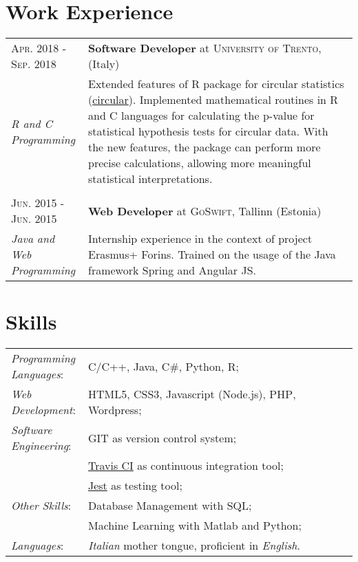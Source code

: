 \documentclass[a4paper,11pt]{article}
\begin{document}
\section{Work Experience}
\begin{tabular}{m{0.225\linewidth}|p{0.775\linewidth}}
  \textsc{Apr. 2018 - Sep. 2018} &
    \textbf{Software Developer} at \textsc{University of Trento}, (Italy) \\
    \emph{R and C Programming} &
    Extended features of R package for circular statistics (\href{https://r-forge.r-project.org/projects/circular/}{circular}). Implemented mathematical routines in R and C languages for calculating the p-value for statistical hypothesis tests for circular data. With the new features, the package can perform more precise calculations, allowing more meaningful statistical interpretations.
    \\
  \multicolumn{2}{c}{} \\
  \textsc{Jun. 2015 - Jun. 2015} &
  \textbf{Web Developer} at \textsc{GoSwift}, Tallinn (Estonia)\\
  \emph{Java and Web Programming} &
  Internship experience in the context of project Erasmus+ Forins. Trained on the usage of the Java framework Spring and Angular JS.
\end{tabular}

\section{Skills}
\begin{tabular}{m{0.225\linewidth} p{0.775\linewidth}}
\emph{Programming Languages}: & C/C++, Java, C\#, Python, R;\\
\emph{Web Development}:       & HTML5, CSS3, Javascript (Node.js), \textsc{PHP}, Wordpress;\\
\emph{Software Engineering}: &\textsc{GIT} as version control system;\\
                     &\href{https://travis-ci.com/}{Travis CI} as continuous integration tool;\\ 
                     &\href{https://jestjs.io/en/}{Jest} as testing tool;\\
\emph{Other Skills}:         & Database Management with \textsc{SQL};\\
                     & Machine Learning with Matlab and Python;\\
\emph{Languages}:            & \emph{Italian} mother tongue, proficient in \emph{English}.\\

\end{tabular}
\end{document}
